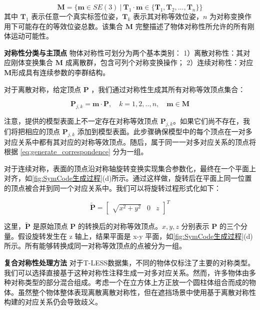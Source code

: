 \begin{equation}
\mathbf{M} = \{\mathbf{m}\in SE(3)\ |\ \mathbf{T}_1 \cdot \mathbf{m} \in \{\mathbf{T}_1, \mathbf{T}_2,..., \mathbf{T}_n\} \}
\label{eq:rigid_motions}
\end{equation}
其中 $\mathbf{T}_1$ 表示任意一个真实标签位姿，$\mathbf{T}_k$ 表示其对称等效位姿，$n$ 为对称变换作用下可能存在的等效位姿总数。该集合 $\mathbf{M}$ 完整描述了物体对称性所允许的所有刚体运动可能性。

\textbf{对称性分类与主顶点 } 物体对称性可划分为两个基本类别：
1）离散对称性：其对应刚体变换集合 $\mathbf{M}$ 成离散群，包含可列个对称变换操作；
2）连续对称性：对应$\mathbf{M}$形成具有连续参数的李群结构。

\par 对于离散对称，给定顶点 $\mathbf{P}$ ，我们通过对称性生成其所有对称等效顶点集合：

\begin{equation}
\mathbf{P}_{j,k}=\mathbf{m} \cdot \mathbf{P},\quad k=1,2,..,n, \quad \mathbf{m} \in \mathbf{M}\label{eq:generate_correspondence}
\end{equation}

\par 注意，提供的模型表面上不一定存在对称等效顶点 $\mathbf{P}_{j,k}$。如果它们尚不存在，我们将把相应的顶点 $\mathbf{P}_{j,k}$ 添加到模型表面。此步骤确保模型中的每个顶点在一对多对应关系中都有其对应的对称等效顶点。随后，属于同一一对多对应关系的顶点将根据 \autoref{eq:generate_correspondence} 分为一组。

\par 对于连续对称，表面的顶点沿对称轴旋转变换实现集合参数化，最终在一个平面上对齐，如\autoref{fig:SymCode生成过程}(d)所示。通过这样做，旋转后在平面上同一位置的顶点被合并到同一个对应关系中。我们可以将旋转过程形式化如下：

\begin{equation}
\tilde{\mathbf{P}}=
\begin{bmatrix}
 \sqrt{x^2+y^2}  &0 &z
\end{bmatrix}^T
\label{eq:rotation_projection}
\end{equation}

这里，$\tilde{\mathbf{P}}$ 是原始顶点 $\mathbf{P}$ 的转换后的对称等效顶点。$x, y, z$ 分别表示 $\mathbf{P}$ 的三个分量。假设旋转发生在 z 轴上，结果平面是 x-y 平面，如\autoref{fig:SymCode生成过程}(d) 所示。所有能够转换成同一对称等效顶点的点被分为一组。

\textbf{复合对称性处理方法 } 对于T-LESS数据集\cite{tless}，不同的物体仅标注了主要的对称类型。我们可以选择直接基于这种对称性注释生成一对多对应关系。然而，许多物体由多种对称类型的部分混合组成。考虑一个在立方体上方正放一个圆柱体组合而成的物体。虽然整个物体整体表现离散离散对称性，但在遮挡场景中使用基于离散对称性构建的对应关系仍会导致歧义。

